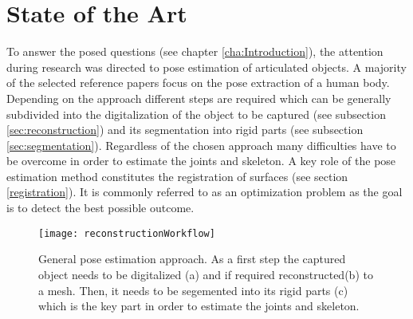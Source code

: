 \chapter{State of the Art}
\label{cha:StateOfTheArt}

To answer the posed questions (see chapter \ref{cha:Introduction}), the attention during research was directed to pose estimation of articulated objects. A majority of the selected reference papers focus on the pose extraction of a human body. Depending on the approach different steps are required which can be generally subdivided into the digitalization of the object to be captured (see subsection \ref{sec:reconstruction}) and its segmentation into rigid parts (see subsection \ref{sec:segmentation}). Regardless of the chosen approach many difficulties have to be overcome in order to estimate the joints and skeleton. A key role of the pose estimation method constitutes the registration of surfaces (see section \ref{registration}). It is commonly referred to as an optimization problem as the goal is to detect the best possible outcome.
%
\begin{figure}[H]
	\centering
	\texttt{[image: reconstructionWorkflow]}
	\caption{General pose estimation approach. As a first step the captured object needs to be digitalized (a) and if required reconstructed(b) to a mesh. Then, it needs to be segemented into its rigid parts (c) which is the key part in order to estimate the joints and skeleton.}
	\label{fig:posecapture}
\end{figure}
%
%
